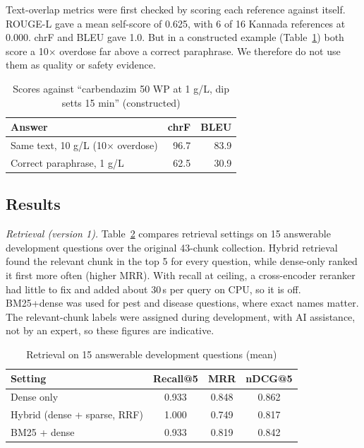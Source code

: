 \documentclass[conference]{IEEEtran}
\begin{document}
Text-overlap metrics were first checked by scoring each reference against itself.
ROUGE-L gave a mean self-score of 0.625, with 6 of 16 Kannada references at 0.000. chrF
\cite{popovic2015chrf} and BLEU gave 1.0. But in a constructed example
(Table~\ref{tab:overdose}) both score a 10$\times$ overdose far above a correct paraphrase.
We therefore do not use them as quality or safety evidence.

\begin{table}[t]
\centering
\caption{Scores against ``carbendazim 50 WP at 1 g/L, dip setts 15 min'' (constructed)}
\label{tab:overdose}
\begin{tabular}{lrr}
\toprule
Answer & chrF & BLEU\\
\midrule
Same text, 10 g/L (10$\times$ overdose) & 96.7 & 83.9\\
Correct paraphrase, 1 g/L & 62.5 & 30.9\\
\bottomrule
\end{tabular}
\end{table}

\subsection{Results}
\textit{Retrieval (version 1).} Table~\ref{tab:retrieval} compares retrieval settings on 15
answerable development questions over the original 43-chunk collection. Hybrid retrieval
found the relevant chunk in the top 5 for every question, while dense-only ranked it first
more often (higher MRR). With recall at ceiling, a cross-encoder reranker had little to fix
and added about 30\,s per query on CPU, so it is off. BM25+dense was used for pest and
disease questions, where exact names matter. The relevant-chunk labels were assigned during
development, with AI assistance, not by an expert, so these figures are indicative.

\begin{table}[t]
\centering
\caption{Retrieval on 15 answerable development questions (mean)}
\label{tab:retrieval}
\footnotesize
\begin{tabular}{lccc}
\toprule
Setting & Recall@5 & MRR & nDCG@5\\
\midrule
Dense only & 0.933 & 0.848 & 0.862\\
Hybrid (dense + sparse, RRF) & 1.000 & 0.749 & 0.817\\
BM25 + dense & 0.933 & 0.819 & 0.842\\
\bottomrule
\end{tabular}
\end{table}
\end{document}

